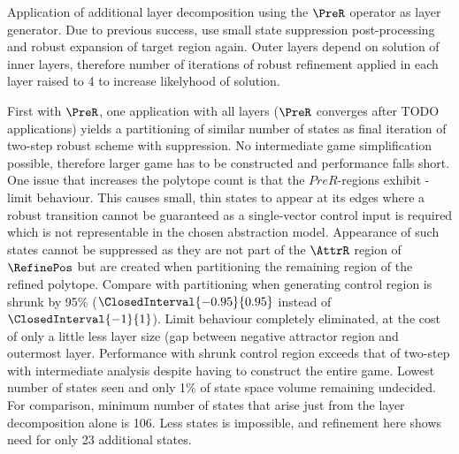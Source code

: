 \stopsubsection


\startsubsection[title={Positive Robust Refinement with Layer Decomposition},reference=sec:cases-integrator-layered]


    Application of additional layer decomposition using the $\PreR$ operator as layer generator.
    Due to previous success, use small state suppression post-processing and robust expansion of target region again.
    Outer layers depend on solution of inner layers, therefore number of iterations of robust refinement applied in each layer raised to 4 to increase likelyhood of solution.


    First with $\PreR$, one application with all layers ($\PreR$ converges after TODO applications) yields a partitioning of similar number of states as final iteration of two-step robust scheme with suppression.
    No intermediate game simplification possible, therefore larger game has to be constructed and performance falls short.
    One issue that increases the polytope count is that the $PreR$-regions exhibit \epsilon-limit behaviour.
    This causes small, thin states to appear at its edges where a robust transition cannot be guaranteed as a single-vector control input is required which is not representable in the chosen abstraction model.
    Appearance of such states cannot be suppressed as they are not part of the $\AttrR$ region of $\RefinePos$ but are created when partitioning the remaining region of the refined polytope.
    Compare with partitioning when generating control region is shrunk by 95\% ($\ClosedInterval{-0.95}{0.95}$ instead of $\ClosedInterval{-1}{1}$).
    Limit behaviour completely eliminated, at the cost of only a little less layer size (gap between negative attractor region and outermost layer.
    Performance with shrunk control region exceeds that of two-step with intermediate analysis despite having to construct the entire game.
    Lowest number of states seen and only 1\% of state space volume remaining undecided.
    For comparison, minimum number of states that arise just from the layer decomposition alone is 106.
    Less states is impossible, and refinement here shows need for only 23 additional states.

